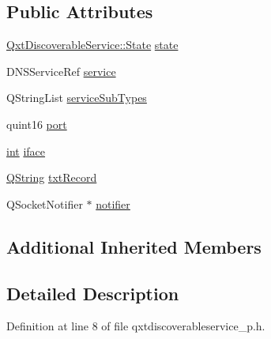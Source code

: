 \subsection*{Public Attributes}
\begin{DoxyCompactItemize}
\item 
\hyperlink{class_qxt_discoverable_service_a2447c7eb207d58a8b338af5d0fd9250a}{Qxt\-Discoverable\-Service\-::\-State} \hyperlink{class_qxt_discoverable_service_private_ae6e96ea9bca35f6a76b1183ca8528dee}{state}
\item 
D\-N\-S\-Service\-Ref \hyperlink{class_qxt_discoverable_service_private_a89f3ba9a5aad5e68434a2d4d050d2cfc}{service}
\item 
Q\-String\-List \hyperlink{class_qxt_discoverable_service_private_af7af4f4e5de28787c111324f62a29659}{service\-Sub\-Types}
\item 
quint16 \hyperlink{class_qxt_discoverable_service_private_a49fda9c17c9e5430046c0e88746a2058}{port}
\item 
\hyperlink{ioapi_8h_a787fa3cf048117ba7123753c1e74fcd6}{int} \hyperlink{class_qxt_discoverable_service_private_a92e36c58936d8b75feaa535373760be5}{iface}
\item 
\hyperlink{group___u_a_v_objects_plugin_gab9d252f49c333c94a72f97ce3105a32d}{Q\-String} \hyperlink{class_qxt_discoverable_service_private_a5cc7b131c2e8cda3147b7218b2a455d6}{txt\-Record}
\item 
Q\-Socket\-Notifier $\ast$ \hyperlink{class_qxt_discoverable_service_private_a4bdc2d5a33ecab1135b07893d01e044a}{notifier}
\end{DoxyCompactItemize}
\subsection*{Additional Inherited Members}


\subsection{Detailed Description}


Definition at line 8 of file qxtdiscoverableservice\-\_\-p.\-h.



